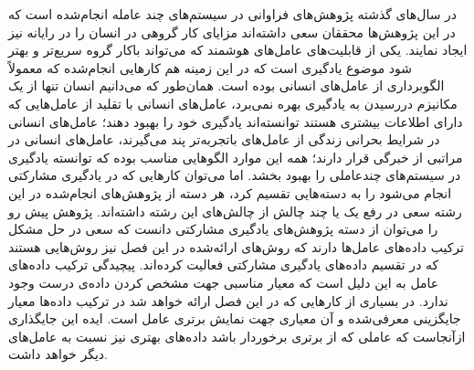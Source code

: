 در سال‌های گذشته پژوهش‌های فراوانی در سیستم‌های چند عامله انجام‌شده است که در این پژوهش‌ها محققان سعی داشته‌اند مزایای کار گروهی در انسان را در رایانه نیز ایجاد نمایند. یکی از قابلیت‌های عامل‌های هوشمند که می‌تواند باکار گروه سریع‌تر و بهتر شود موضوع یادگیری است که در این زمینه هم کارهایی انجام‌شده که معمولاً الگوبرداری از عامل‌های انسانی بوده است. همان‌طور که می‌دانیم انسان تنها از یک مکانیزم دررسیدن به یادگیری بهره نمی‌برد، عامل‌های انسانی با تقلید از عامل‌هایی که دارای اطلاعات بیشتری هستند توانسته‌اند یادگیری خود را بهبود دهند؛ عامل‌های انسانی در شرایط بحرانی زندگی از عامل‌های باتجربه‌تر پند می‌گیرند، عامل‌های انسانی در مراتبی از خبرگی قرار دارند؛ همه این موارد الگوهایی مناسب بوده که توانسته یادگیری در سیستم‌های چندعاملی را بهبود بخشد.
اما می‌توان کارهایی که در یادگیری مشارکتی انجام می‌شود را به دسته‌هایی تقسیم کرد، هر دسته از پژوهش‌های انجام‌شده در این رشته سعی در رفع یک یا چند چالش از چالش‌های این رشته داشته‌اند. پژوهش پیش رو را می‌توان از دسته پژوهش‌های یادگیری مشارکتی دانست که سعی در حل مشکل ترکیب داده‌های عامل‌ها دارند که روش‌های ارائه‌شده در این فصل نیز روش‌هایی هستند که در تقسیم داده‌های یادگیری مشارکتی فعالیت کرده‌اند.
پیچیدگی ترکیب داده‌های عامل به این دلیل است که معیار مناسبی جهت مشخص کردن داده‌ی درست وجود ندارد. در بسیاری از کارهایی که در این فصل ارائه خواهد شد در ترکیب داده‌ها معیار جایگزینی معرفی‌شده و آن معیاری جهت نمایش برتری عامل است. ایده این جایگذاری ازآنجاست که عاملی که از برتری برخوردار باشد داده‌های بهتری نیز نسبت به عامل‌های دیگر خواهد داشت.